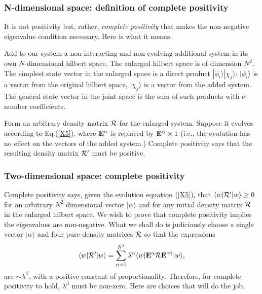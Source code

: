 \documentclass[aps,pra,amssymb, amsfonts,amsmath,showpacs, superscriptaddress,12pt]{revtex4}
\begin{document}
\subsubsection{N-dimensional space: definition of complete positivity}

It is  not positivity but, rather, \textit{complete positivity} that makes the non-negative eigenvalue condition necessary. Here is what it means.

Add to our system a non-interacting and non-evolving additional system in its own $N$-dimensional hilbert space. The enlarged hilbert space is of dimension $N^{2}$. The simplest state vector in the enlarged space is a direct product $|\phi_{i}\rangle |\chi_{j}\rangle$: $|\phi_{i}\rangle$ is a vector from the original hilbert space, $|\chi_{j}\rangle$ is a vector from the added system.  The general state vector in the joint space is the sum of such products with c-number coefficients.  

Form an arbitrary density matrix ${ \cal R}$ for the enlarged system. Suppose it evolves according to Eq.(\ref{X5}), where ${\bf E}^{\alpha}$ is replaced by  ${\bf E}^{\alpha}\times1$ (i.e., the evolution has no effect on the vectors of the added system.) Complete positivity says that the resulting density matrix ${\cal R}'$ must be positive. 

\subsubsection{Two-dimensional space: complete positivity}

Complete positivity says, given the evolution equation (\ref{X5}), that $\langle w|{\cal R}'|w\rangle\geq0$ for an arbitrary $N^{2}$ dimensional vector $|w\rangle$  and for any initial density matrix ${\cal R}$ in the enlarged hilbert space.  We wish to prove  that complete positivity implies the eigenvalues are non-negative.  What we shall do is judiciously choose a single vector $|w\rangle$  and four pure density matrices ${\cal R}$ so that the expressions 
\[
 \langle w|{\cal R}'|w\rangle=\sum_{\alpha=1}^{N^{2}}\lambda^{\alpha}\langle w|{\bf E}^{\alpha}{\cal R}{\bf E}^{\alpha\dagger}|w\rangle,
\]
\noindent  are $\sim \lambda^{\beta}$, with a positive constant of proportionality. Therefore,  for complete positivity to hold, $ \lambda^{\beta}$ must be non-zero.  Here are choices that will do the job. 
\end{document}
